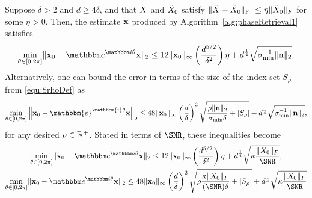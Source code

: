 \begin{theorem}
Suppose $\delta > 2$ and $d \ge 4 \delta$, and that $\tilde{X}$ and $\tilde{X}_0$ satisfy $\Vert \tilde{X} - \tilde{X}_0 \Vert_{\rm F}~\leq \eta \Vert \tilde{X}_0 \Vert_F$ for some $\eta>0$.  Then, the estimate $\mathbf x$ produced by Algorithm~\ref{alg:phaseRetrieval1} satisfies 
\[ \mintheta \norm{\x_0 - \eit \x}_2 \leq 12 \norm{\x_0}_{\infty} \left( \frac{d^{5/2}}{\delta^2} \right) \eta  + d^{\frac{1}{4}} \sqrt{\sigma_{\min}^{-1} \| \n \|_2 },\]
Alternatively, one can bound the error in terms of the size of the index set $S_\rho$ from \eqref{equ:SrhoDef} as
        \begin{equation}
\min_{\theta \in [0, 2 \pi]} \left\Vert  \x_0 - \mathbbm{e}^{\mathbbm{i} \theta} \x \right\Vert_2 \leq 48 \Vert \x_0 
        \Vert_{\infty} \left( \frac{d}{\delta} \right)^2 \sqrt{ \frac{\rho \norm{\n}_2}{\sigma_{\min}\delta} + \left| S_\rho \right|} + d^{\frac{1}{4}} \sqrt{\sigma_{\min}^{-1} \| \n \|_2 }, \label{equ:ManRes2} 
\end{equation}
for any desired $\rho \in \mathbb{R}^+$.  Stated in terms of $\SNR$, these inequalities become
\begin{equation}
  \begin{gathered}
    \mintheta \norm{\x_0 - \eit \x}_2 \leq 12 \norm{\x_0}_{\infty} \left(\frac{d^{5/2}}{\delta^2}\right) \eta  + d^{\frac{1}{4}} \sqrt{\kappa \frac{\norm{X_0}_F}{\SNR} }, \\
    \mintheta \norm{\x_0 - \eit \x}_2 \leq 48 \norm{\x_0}_{\infty} \left( \frac{d}{\delta} \right)^2 \sqrt{\rho \frac{\kappa \norm{X_0}_F}{(\SNR) \delta} + \left| S_\rho \right|} + d^{\frac{1}{4}} \sqrt{\kappa \frac{\norm{X_0}_F}{\SNR}}
  \end{gathered}
  \label{eq:mainres2_SNR}
\end{equation}
        
\label{thm:MainRes}
\end{theorem}

